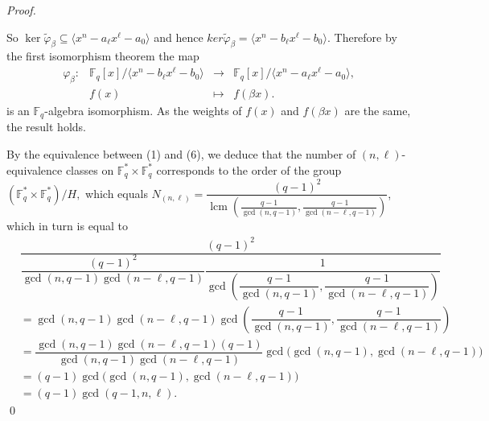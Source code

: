\documentclass[12pt]{elsarticle}
\newcommand{\Fq}{\mathbb{F}_{q}}
\DeclareMathOperator{\lcm}{lcm}
\theoremstyle{break}
{\theorembodyfont{\upshape}
    \newtheorem{theorem}{Theorem}[section] %
    \newtheorem{lemma}[theorem]{Lemma} %
    \newtheorem{proposition}[theorem]{Proposition}
    \newtheorem{corollary}[theorem]{Corollary}
    \newtheorem{definition}[theorem]{Definition}
    \newtheorem{example}[theorem]{Example}
    \newtheorem{remark}[theorem]{Remark}
    \newtheorem{conjecture}[theorem]{Conjecture}
    \newtheorem*{proof}{{Proof}}
	\newtheorem*{notation}{Notation}
	\newtheorem*{main}{Cain Theorem}
	\newtheorem*{problem}{Problem}
}
\begin{document}
\begin{proof}
\begin{enumerate}
	So $\ker\tilde{\varphi}_{\beta} \subseteq \langle x^{n}- a_{\ell} x^{\ell} - a_0\rangle $ and hence $ker\tilde{\varphi}_{\beta} = \langle x^{n}-  b_{\ell} x^{\ell} - b_0 \rangle$.
	Therefore  by the  first isomorphism  theorem the map 
      \begin{equation}
        \begin{array}{cccc}
        \varphi_{\beta} : & \mathbb{F}_q[x]/\langle x^n - b_{\ell} x^{\ell} - b_0 \rangle  & \longrightarrow & \mathbb{F}_q[x] /\langle x^n - a_{\ell} x^{\ell} - a_0 \rangle, \\ 
        & f(x) & \longmapsto & f(\beta x).
        \end{array}
    \end{equation} 
	is an $\Fq$-algebra isomorphism. As  the weights of $f(x)$ and $f(\beta x)$ are the same, the result holds. 
\end{enumerate}

By the equivalence between (1) and (6), we deduce that the number of $(n,\ell)$-equivalence classes on $\Fq^*\times \Fq^*$ corresponds to the order of the group $ \left( \Fq^*\times \Fq^* \right)/H,$ which equals $ N_{(n,\ell)}=\dfrac{ (q-1)^2}{ \lcm(\frac{q-1}{ \gcd(n,q-1)}, \frac{q-1}{ \gcd(n-\ell,q-1)})}
$, which in turn is equal to
$$    
\begin{array}{rl}
  &\dfrac{(q-1)^2}{\dfrac{(q-1)^2}{ \gcd(n,q-1)\gcd(n-\ell,q-1)} \dfrac{1}{\gcd(\dfrac{q-1}{ \gcd(n,q-1)}, \dfrac{q-1}{ \gcd(n-\ell,q-1)})}} \\
    
     &=\gcd(n,q-1)\gcd(n-\ell,q-1)\gcd\left(\dfrac{q-1}{ \gcd(n,q-1)}, \dfrac{q-1}{ \gcd(n-\ell,q-1)}\right)\\
    &= \dfrac{\gcd(n,q-1)\gcd(n-\ell,q-1)(q-1)}{\gcd(n,q-1)\gcd(n-\ell,q-1)} \gcd\big(\gcd(n,q-1),\gcd(n-\ell,q-1)\big)\\
    &= (q-1) \gcd\big(\gcd(n,q-1),\gcd(n-\ell,q-1)\big)\\
    &= (q-1) \gcd(q-1,n,\ell) .
 \end{array}
$$
\qed
\end{proof}
\end{document}
